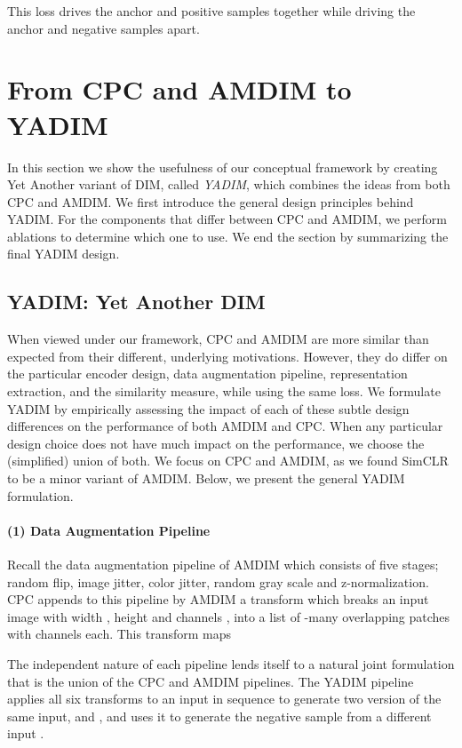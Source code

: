 \documentclass{article}
\begin{document}
This loss drives the anchor and positive samples together while driving the anchor and negative samples apart.

\section{From CPC and AMDIM to YADIM}

In this section we show the usefulness of our conceptual framework by creating Yet Another variant of DIM, called \textit{YADIM}, which combines the ideas from both CPC and AMDIM. We first introduce the general design principles behind YADIM. For the components that differ between CPC and AMDIM, we perform ablations to determine which one to use. We end the section by summarizing the final YADIM design.

\subsection{YADIM: Yet Another DIM}

When viewed under our framework, CPC and AMDIM are more similar than expected from their different, underlying motivations. However, they do differ on the particular encoder design, data augmentation pipeline, representation extraction, and the similarity measure, while using the same loss. We formulate YADIM by empirically assessing the impact of each of these subtle design differences on the performance of both AMDIM and CPC.
When any particular design choice does not have much impact on the performance,  we choose the (simplified) union of both. We focus on CPC and AMDIM, as we found SimCLR to be a minor variant of AMDIM. Below, we present the general YADIM formulation.

\paragraph{(1) Data Augmentation Pipeline}

Recall the data augmentation pipeline of AMDIM which consists of five stages;  
random flip, 
image jitter, 
color jitter, 
random gray scale and 
z-normalization. CPC appends to this pipeline by AMDIM a transform which breaks an input image  with width , height  and channels , into a list of -many  overlapping patches with  channels each. This transform maps 

The independent nature of each pipeline lends itself to a natural joint formulation that is the union of the CPC and AMDIM pipelines. The YADIM pipeline applies all six transforms to an input in sequence to generate two version of the same input,  and , and uses it to generate the negative sample from a different input .
\end{document}
